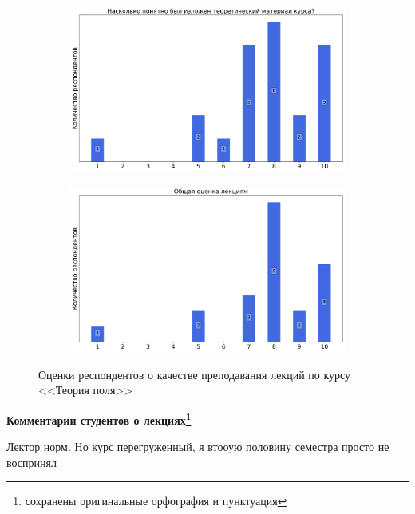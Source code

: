 \begin{figure}[H]
\begin{subfigure}[b]{0.45\textwidth}
			\end{subfigure}
			\begin{subfigure}[b]{0.45\textwidth}
				\centering
				\includegraphics[width=\textwidth]{images/3 course/Теория поля/lecturer-marks-Фомичев С.В.-2.png}
			\end{subfigure}	
			\begin{subfigure}[b]{0.45\textwidth}
				\centering
				\includegraphics[width=\textwidth]{images/3 course/Теория поля/lecturer-marks-Фомичев С.В.-3.png}
			\end{subfigure}
			\caption{Оценки респондентов о качестве преподавания лекций по курсу <<Теория поля>>}
		\end{figure}

		\textbf{Комментарии студентов о лекциях\protect\footnote{сохранены оригинальные орфография и пунктуация}}
            \begin{commentbox} 
                Лектор норм. Но курс перегруженный, я втооую половину семестра просто не воспринял 
            \end{commentbox} 
        
